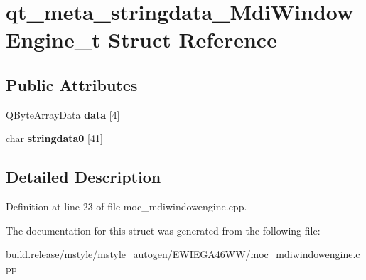 \hypertarget{structqt__meta__stringdata___mdi_window_engine__t}{}\section{qt\+\_\+meta\+\_\+stringdata\+\_\+\+Mdi\+Window\+Engine\+\_\+t Struct Reference}
\label{structqt__meta__stringdata___mdi_window_engine__t}
\subsection*{Public Attributes}
\begin{DoxyCompactItemize}
\item 
\mbox{\label{structqt__meta__stringdata___mdi_window_engine__t_a28ee6d0724f93af57b591f5b95064d16}} 
Q\+Byte\+Array\+Data {\bfseries data} \mbox{[}4\mbox{]}
\item 
\mbox{\label{structqt__meta__stringdata___mdi_window_engine__t_ab420885f58db541bb494956e57bb3861}} 
char {\bfseries stringdata0} \mbox{[}41\mbox{]}
\end{DoxyCompactItemize}


\subsection{Detailed Description}


Definition at line 23 of file moc\+\_\+mdiwindowengine.\+cpp.



The documentation for this struct was generated from the following file\+:\begin{DoxyCompactItemize}
\item 
build.\+release/mstyle/mstyle\+\_\+autogen/\+E\+W\+I\+E\+G\+A46\+W\+W/moc\+\_\+mdiwindowengine.\+cpp\end{DoxyCompactItemize}
